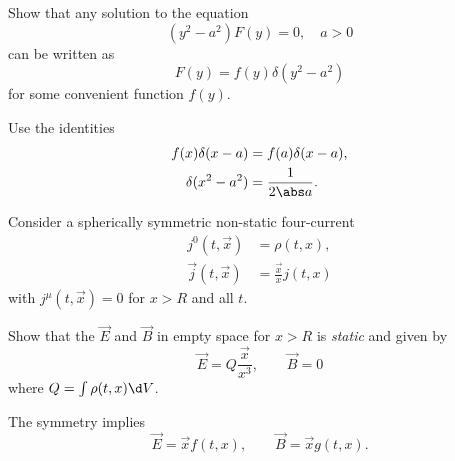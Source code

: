 \documentclass{phys151}
\begin{document}
\begin{solution}
  
\end{solution}

\begin{problem}
  Show that any solution to the equation
  \[
    (y^2 - a^2) F(y) = 0, \quad a > 0
  \]
  can be written as
  \[
    F(y) = f(y) \delta(y^2 - a^2)
  \]
  for some convenient function \(f(y)\).
  \begin{hint}
    Use the identities
    \begin{align*}
      f(x) \delta(x-a) &= f(a) \delta(x-a), \\
      \delta(x^2-a^2) &= \frac 1 {2 \abs a}.
    \end{align*}
  \end{hint}
\end{problem}

\begin{solution}
  
\end{solution}

\begin{problem}
  Consider a spherically symmetric non-static four-current
  \begin{align*}
    j^0(t, \vec x) &= \rho(t, x), \\
    \vec j(t, \vec x) &= \frac {\vec x} x j(t, x)
  \end{align*}
  with \(j^\mu(t, \vec x) = 0\) for \(x > R\) and all \(t\).

  Show that the \(\vec E\) and \(\vec B\) in empty space for \(x>R\) is
  \emph{static} and given by
  \[
    \vec E = Q \frac {\vec x} {x^3}, \qquad \vec B = 0
  \]
  where \(Q = \int \rho(t, x) \d V\).

  \begin{hint}
    The symmetry implies
    \[
      \vec E = \vec x f(t, x), \qquad \vec B = \vec x g(t, x).
    \]
  \end{hint}
\end{problem}

\begin{solution}
  
\end{solution}
\end{document}
